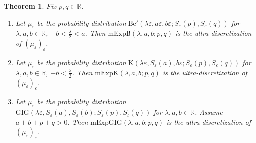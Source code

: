 \documentclass[pdftex]{sigma}
\numberwithin{equation}{section}
\newtheorem{Theorem}{Theorem}[section]
\def\R{\mathbb{R}}
\def\e{\varepsilon}
\newcommand{\la}{\lambda}
\begin{document}
\begin{Theorem}\label{thm:trop-dist}
Fix $p,q \in \mathbb R$.
\begin{enumerate}
\item[$(i)$] Let $\mu_{\e}$ be the probability distribution $\mathrm{Be}'(\la \e, a\e ,b \e; S_{\e}(p), S_{\e}(q))$ for $\lambda, a,b \in \R$, ${-b\! <\! \frac{\lambda}{2}\! <\! a}$. Then $\mathrm{mExpB}(\la , a,b ; p, q)$ is the ultra-discretization of $(\mu_{\e})_{\e}$.

\item[$(ii)$] Let $\mu_{\e}$ be the probability distribution $\mathrm{K}(\la \e, S_{\e}(a) ,b \e; S_{\e}(p), S_{\e}(q))$ for $\lambda,a,b \in \R$, $-b < \frac{\lambda}{2}$. Then $\mathrm{mExpK}(\la , a,b ; p, q)$ is the ultra-discretization of $(\mu_{\e})_{\e}$.

\item[$(iii)$] Let $\mu_{\e}$ be the probability distribution $\mathrm{GIG}(\la \e, S_{\e}(a) ,S_{\e}(b); S_{\e}(p), S_{\e}(q))$ for $\lambda,a,b \in \R$. Assume $a+b+p+q>0$. Then $\mathrm{mExpGIG} (\lambda,a,b ; p, q)$ is the ultra-discretization of $(\mu_{\e})_{\e}$.
\end{enumerate}
\end{Theorem}
\end{document}
